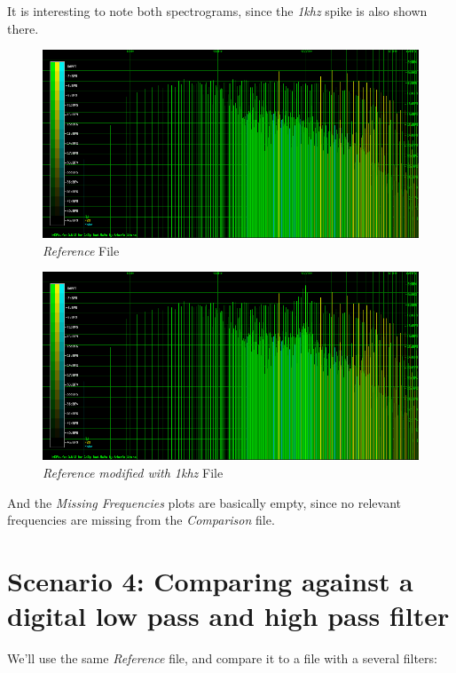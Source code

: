 \documentclass[10pt,a4paper]{report}
\begin{document}
It is interesting to note both spectrograms, since the \textit{1khz} spike is also shown there.

\begin{figure}[H]
	\centering
	\includegraphics[width=1.0\linewidth]{plots/Plot3-Spectrogram}
	\caption[Reference File]{\textit{Reference} File}
	\label{fig:plot3-spectrogram}
\end{figure}

\begin{figure}[H]
	\centering
	\includegraphics[width=1.0\linewidth]{plots/Plot3-Spectrogram-1khz}
	\caption[Reference File]{\textit{Reference modified with 1khz} File}
	\label{fig:plot3-spectrogram-1khz}
\end{figure}


And the \textit{Missing Frequencies} plots are basically empty, since no relevant frequencies are missing from the \textit{Comparison} file.

\section{Scenario 4: Comparing against a digital low pass and high pass filter}

We'll use the same \textit{Reference} file, and compare it to a file with a several filters:
\end{document}
